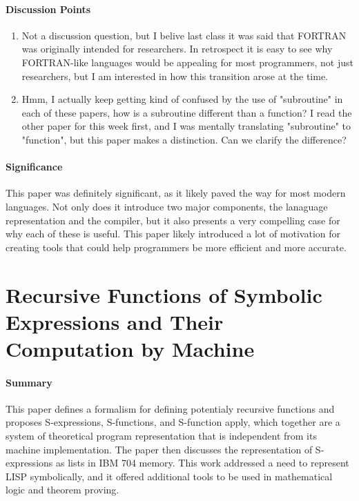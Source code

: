 \paragraph{\textbf{Discussion Points}}
\begin{enumerate}
    \item Not a discussion question, but I belive last class it was said that
    FORTRAN was originally intended for researchers. In retrospect it is easy to
    see why FORTRAN-like languages would be appealing for most programmers, not
    just researchers, but I am interested in how this transition arose at the
    time.
    \item Hmm, I actually keep getting kind of confused by the use of
    "subroutine" in each of these papers, how is a subroutine different than a
    function? I read the other paper for this week first, and I was mentally
    translating "subroutine" to "function", but this paper makes a distinction.
    Can we clarify the difference?
\end{enumerate}
\paragraph{\textbf{Significance}}
This paper was definitely significant, as it likely paved the way for most
modern languages. Not only does it introduce two major components, the lanaguage
representation and the compiler, but it also presents a very compelling case for
why each of these is useful. This paper likely introduced a lot of motivation
for creating tools that could help programmers be more efficient and more
accurate.

\section {Recursive Functions of Symbolic Expressions and Their Computation by
Machine \cite{mccarthy1959recursive}}

\paragraph{\textbf{Summary}}
This paper defines a formalism for defining potentialy recursive functions and
proposes S-expressions, S-functions, and S-function apply, which together are a
system of theoretical program representation that is independent from its
machine implementation. The paper then discusses the representation of
S-expressions as lists in IBM 704 memory. This work addressed a need to
represent LISP symbolically, and it offered additional tools to be used in
mathematical logic and theorem proving.

